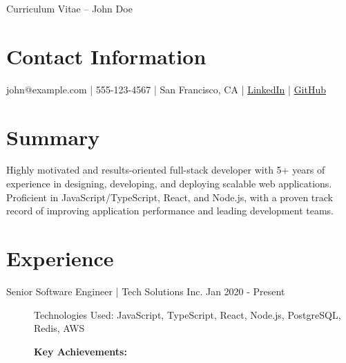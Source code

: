 \documentclass[margin,line]{resume}
\begin{document}
{\sc \Large Curriculum Vitae -- John Doe}
\begin{resume}

\section{Contact Information}
john@example.com | 555-123-4567 | San Francisco, CA | \href{https://linkedin.com/in/johndoe}{LinkedIn} | \href{https://github.com/johndoe}{GitHub}

\section{Summary}
Highly motivated and results-oriented full-stack developer with 5+ years of experience in designing, developing, and deploying scalable web applications. Proficient in JavaScript/TypeScript, React, and Node.js, with a proven track record of improving application performance and leading development teams.

\section{Experience}
\begin{description}
\item[Senior Software Engineer | Tech Solutions Inc. \hfill Jan 2020 - Present]
\small{Technologies Used: JavaScript, TypeScript, React, Node.js, PostgreSQL, Redis, AWS}

\textbf{Key Achievements:}


\end{description}
\end{resume}
\end{document}
